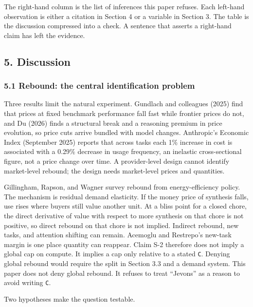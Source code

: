 \documentclass[
  10pt,
]{article}
\begin{document}
The right-hand column is the list of inferences this paper refuses. Each
left-hand observation is either a citation in Section 4 or a variable in
Section 3. The table is the discussion compressed into a check. A
sentence that asserts a right-hand claim has left the evidence.

\subsection{5. Discussion}\label{discussion}

\subsubsection{5.1 Rebound: the central identification
problem}\label{rebound-the-central-identification-problem}

Three results limit the natural experiment. Gundlach and colleagues
(2025) find that prices at fixed benchmark performance fall fast while
frontier prices do not, and Du (2026) finds a structural break and a
reasoning premium in price evolution, so price cuts arrive bundled with
model changes. Anthropic's Economic Index (September 2025) reports that
across tasks each 1\% increase in cost is associated with a 0.29\%
decrease in usage frequency, an inelastic cross-sectional figure, not a
price change over time. A provider-level design cannot identify
market-level rebound; the design needs market-level prices and
quantities.

Gillingham, Rapson, and Wagner survey rebound from energy-efficiency
policy. The mechanism is residual demand elasticity. If the money price
of synthesis falls, use rises where buyers still value another unit. At
a bliss point for a closed chore, the direct derivative of value with
respect to more synthesis on that chore is not positive, so direct
rebound on that chore is not implied. Indirect rebound, new tasks, and
attention shifting can remain. Acemoglu and Restrepo's new-task margin
is one place quantity can reappear. Claim S-2 therefore does not imply a
global cap on compute. It implies a cap only relative to a stated
\texttt{C}. Denying global rebound would require the split in Section
3.3 and a demand system. This paper does not deny global rebound. It
refuses to treat ``Jevons'' as a reason to avoid writing \texttt{C}.

Two hypotheses make the question testable.
\end{document}
